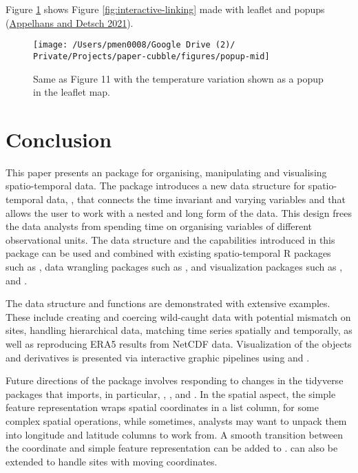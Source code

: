 \documentclass{article}
\begin{document}
Figure \ref{fig:interactive-popup} shows Figure \ref{fig:interactive-linking} made with leaflet and popups (\protect\hyperlink{ref-leafpop}{Appelhans and Detsch 2021}).

\begin{figure}

{\centering \texttt{[image: /Users/pmen0008/Google Drive (2)/ Private/Projects/paper-cubble/figures/popup-mid]} 

}

\caption{Same as Figure 11 with the temperature variation shown as a popup in the leaflet map.}\label{fig:interactive-popup}
\end{figure}

\hypertarget{conclude}{%
\section{Conclusion}\label{conclude}}

This paper presents an  package  for organising, manipulating and visualising spatio-temporal data. The package introduces a new data structure for spatio-temporal data, , that connects the time invariant and varying variables and that allows the user to work with a nested and long form of the data. This design frees the data analysts from spending time on organising variables of different observational units. The data structure and the capabilities introduced in this package can be used and combined with existing spatio-temporal R packages such as , data wrangling packages such as , and visualization packages such as ,  and .

The data structure and functions are demonstrated with extensive examples. These include creating and coercing wild-caught data with potential mismatch on sites, handling hierarchical data, matching time series spatially and temporally, as well as reproducing ERA5 results from NetCDF data. Visualization of the  objects and derivatives is presented via interactive graphic pipelines using  and .

Future directions of the package involves responding to changes in the tidyverse packages that  imports, in particular, , , and . In the spatial aspect, the simple feature representation wraps spatial coordinates in a list column, for some complex spatial operations, while sometimes, analysts may want to unpack them into longitude and latitude columns to work from. A smooth transition between the coordinate and simple feature representation can be added to .  can also be extended to handle sites with moving coordinates.
\end{document}
